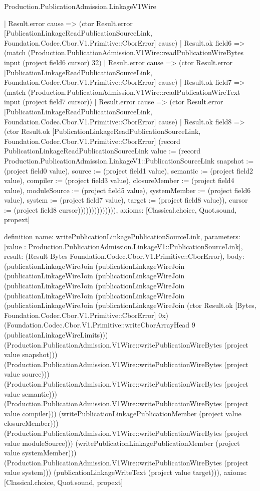 \begin{lexlean}{Production.PublicationAdmission.LinkageV1Wire}
\begin{semanticmodule}
{                    | Result.error cause => (ctor Result.error [PublicationLinkageReadPublicationSourceLink, Foundation.Codec.Cbor.V1.Primitive::CborError] cause)
                    | Result.ok field6 => (match (Production.PublicationAdmission.V1Wire::readPublicationWireBytes input (project field6 cursor) 32)
                      | Result.error cause => (ctor Result.error [PublicationLinkageReadPublicationSourceLink, Foundation.Codec.Cbor.V1.Primitive::CborError] cause)
                      | Result.ok field7 => (match (Production.PublicationAdmission.V1Wire::readPublicationWireText input (project field7 cursor))
                        | Result.error cause => (ctor Result.error [PublicationLinkageReadPublicationSourceLink, Foundation.Codec.Cbor.V1.Primitive::CborError] cause)
                        | Result.ok field8 => (ctor Result.ok [PublicationLinkageReadPublicationSourceLink, Foundation.Codec.Cbor.V1.Primitive::CborError] (record PublicationLinkageReadPublicationSourceLink {value := (record Production.PublicationAdmission.LinkageV1::PublicationSourceLink {snapshot := (project field0 value), source := (project field1 value), semantic := (project field2 value), compiler := (project field3 value), closureMember := (project field4 value), moduleSource := (project field5 value), systemMember := (project field6 value), system := (project field7 value), target := (project field8 value)}), cursor := (project field8 cursor)}))))))))))))),
  axioms: [Classical.choice, Quot.sound, propext]
}

definition{
  name: writePublicationLinkagePublicationSourceLink,
  parameters: [value : Production.PublicationAdmission.LinkageV1::PublicationSourceLink],
  result: (Result Bytes Foundation.Codec.Cbor.V1.Primitive::CborError),
  body: (publicationLinkageWireJoin (publicationLinkageWireJoin (publicationLinkageWireJoin (publicationLinkageWireJoin (publicationLinkageWireJoin (publicationLinkageWireJoin (publicationLinkageWireJoin (publicationLinkageWireJoin (publicationLinkageWireJoin (publicationLinkageWireJoin (ctor Result.ok [Bytes, Foundation.Codec.Cbor.V1.Primitive::CborError] 0x) (Foundation.Codec.Cbor.V1.Primitive::writeCborArrayHead 9 (publicationLinkageWireLimits))) (Production.PublicationAdmission.V1Wire::writePublicationWireBytes (project value snapshot))) (Production.PublicationAdmission.V1Wire::writePublicationWireBytes (project value source))) (Production.PublicationAdmission.V1Wire::writePublicationWireBytes (project value semantic))) (Production.PublicationAdmission.V1Wire::writePublicationWireBytes (project value compiler))) (writePublicationLinkagePublicationMember (project value closureMember))) (Production.PublicationAdmission.V1Wire::writePublicationWireBytes (project value moduleSource))) (writePublicationLinkagePublicationMember (project value systemMember))) (Production.PublicationAdmission.V1Wire::writePublicationWireBytes (project value system))) (publicationLinkageWriteText (project value target))),
  axioms: [Classical.choice, Quot.sound, propext]
}


\end{semanticmodule}
\end{lexlean}
